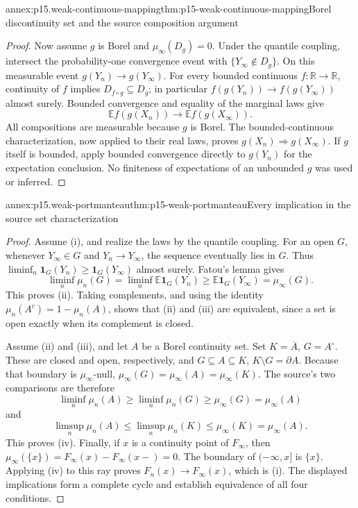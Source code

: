 \begin{annexitem}{annex:p15.weak-continuous-mapping}{thm:p15-weak-continuous-mapping}{Borel discontinuity set and the source composition argument}
\begin{proof}
Now assume \(g\) is Borel and \(\mu_\infty(D_g)=0\).
Under the quantile coupling, intersect the probability-one
convergence event with \(\{Y_\infty\notin D_g\}\).
On this measurable event \(g(Y_n)\to g(Y_\infty)\).
For every bounded continuous \(f:\mathbb R\to\mathbb R\),
continuity of \(f\) implies \(D_{f\circ g}\subseteq D_g\);
in particular \(f(g(Y_n))\to f(g(Y_\infty))\) almost surely.
Bounded convergence and equality of the marginal laws give
\[
 \mathbb E f(g(X_n))\longrightarrow
                      \mathbb E f(g(X_\infty)).
\]
All compositions are measurable because \(g\) is Borel.
The bounded-continuous characterization, now applied to their
real laws, proves \(g(X_n)\Rightarrow g(X_\infty)\).
If \(g\) itself is bounded, apply bounded convergence directly
to \(g(Y_n)\) for the expectation conclusion. No finiteness
of expectations of an unbounded \(g\) was used or inferred.
\end{proof}
\end{annexitem}

\begin{annexitem}{annex:p15.weak-portmanteau}{thm:p15-weak-portmanteau}{Every implication in the source set characterization}
\begin{proof}
Assume (i), and realize the laws by the quantile coupling.
For an open \(G\), whenever \(Y_\infty\in G\) and
\(Y_n\to Y_\infty\), the sequence eventually lies in \(G\).
Thus
\(\liminf_n\mathbf1_G(Y_n)\geq\mathbf1_G(Y_\infty)\)
almost surely. Fatou's lemma gives
\[
 \liminf_n\mu_n(G)=\liminf_n\mathbb E\mathbf1_G(Y_n)
       \geq\mathbb E\mathbf1_G(Y_\infty)=\mu_\infty(G).
\]
This proves (ii). Taking complements, and using the identity
\(\mu_n(A^c)=1-\mu_n(A)\), shows that (ii) and (iii)
are equivalent, since a set is open exactly when its
complement is closed.

Assume (ii) and (iii), and let \(A\) be a Borel continuity set.
Set \(K=\overline A\), \(G=A^\circ\).
These are closed and open, respectively, and
\(G\subseteq A\subseteq K\), \(K\setminus G=\partial A\).
Because that boundary is \(\mu_\infty\)-null,
\(\mu_\infty(G)=\mu_\infty(A)=\mu_\infty(K)\).
The source's two comparisons are therefore
\[
 \liminf_n\mu_n(A)\geq\liminf_n\mu_n(G)
                   \geq\mu_\infty(G)=\mu_\infty(A)
\]
and
\[
 \limsup_n\mu_n(A)\leq\limsup_n\mu_n(K)
                   \leq\mu_\infty(K)=\mu_\infty(A).
\]
This proves (iv). Finally, if \(x\) is a continuity point
of \(F_\infty\), then
\(\mu_\infty(\{x\})=F_\infty(x)-F_\infty(x-)=0\).
The boundary of \((-\infty,x]\) is \(\{x\}\).
Applying (iv) to this ray proves \(F_n(x)\to F_\infty(x)\),
which is (i). The displayed implications form a complete
cycle and establish equivalence of all four conditions.
\end{proof}
\end{annexitem}

